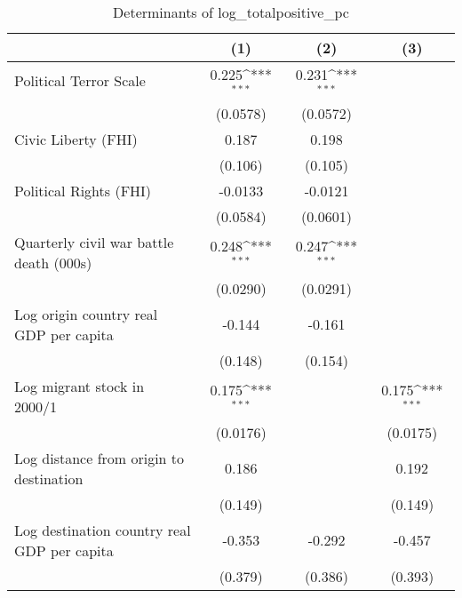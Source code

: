 \begin{table}[htbp]\centering
\def\sym#1{\ifmmode^{#1}\else\(^{#1}\)\fi}
\caption{Determinants of log\_totalpositive\_pc}
\begin{tabular}{l*{3}{c}}
\hline\hline
                    &\multicolumn{1}{c}{(1)}         &\multicolumn{1}{c}{(2)}         &\multicolumn{1}{c}{(3)}         \\
\hline
Political Terror Scale&       0.225\sym{***}&       0.231\sym{***}&                     \\
                    &    (0.0578)         &    (0.0572)         &                     \\
[1em]
Civic Liberty (FHI) &       0.187         &       0.198         &                     \\
                    &     (0.106)         &     (0.105)         &                     \\
[1em]
Political Rights (FHI)&     -0.0133         &     -0.0121         &                     \\
                    &    (0.0584)         &    (0.0601)         &                     \\
[1em]
Quarterly civil war battle death (000s)&       0.248\sym{***}&       0.247\sym{***}&                     \\
                    &    (0.0290)         &    (0.0291)         &                     \\
[1em]
Log origin country real GDP per capita&      -0.144         &      -0.161         &                     \\
                    &     (0.148)         &     (0.154)         &                     \\
[1em]
Log migrant stock in 2000/1&       0.175\sym{***}&                     &       0.175\sym{***}\\
                    &    (0.0176)         &                     &    (0.0175)         \\
[1em]
Log distance from origin to destination&       0.186         &                     &       0.192         \\
                    &     (0.149)         &                     &     (0.149)         \\
[1em]
Log destination country real GDP per capita&      -0.353         &      -0.292         &      -0.457         \\
                    &     (0.379)         &     (0.386)         &     (0.393)         \\

\end{tabular}
\end{table}
